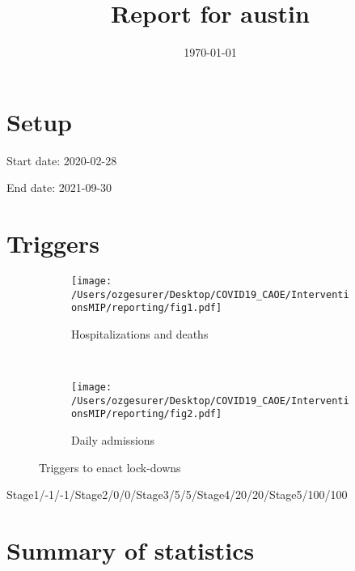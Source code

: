 \documentclass{article}
\title{Report for austin}
\author{}
\date{\today}
\begin{document}
\maketitle

\section*{Setup}

Start date: 2020-02-28

End date: 2021-09-30 




\section*{Triggers}
\begin{figure}[!htb]
  \centering
  \setlength{\unitlength}{1cm}
    \begin{subfigure}[b]{0.475\linewidth}
    \centering
        \texttt{[image: /Users/ozgesurer/Desktop/COVID19\_CAOE/InterventionsMIP/reporting/fig1.pdf]}
        \caption{Hospitalizations  and deaths}
        \label{fig:IHD}
    \end{subfigure}
    ~
    \begin{subfigure}[b]{0.475\linewidth}
    \centering
         \texttt{[image: /Users/ozgesurer/Desktop/COVID19\_CAOE/InterventionsMIP/reporting/fig2.pdf]}
        \caption{Daily admissions}
        \label{fig:IYIH}
    \end{subfigure}
    \caption{Triggers to enact lock-downs}\label{fig:SD90}
\end{figure}

Stage1/-1/-1/Stage2/0/0/Stage3/5/5/Stage4/20/20/Stage5/100/100

\newpage

\section*{Summary of statistics}
\end{document}
